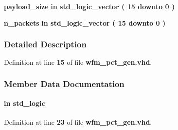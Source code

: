 \begin{DoxyCompactItemize}
\item 
{\bf payload\+\_\+size}  {\bfseries {\bfseries \textcolor{keywordflow}{in}\textcolor{vhdlchar}{ }}} {\bfseries \textcolor{comment}{std\+\_\+logic\+\_\+vector}\textcolor{vhdlchar}{ }\textcolor{vhdlchar}{(}\textcolor{vhdlchar}{ }\textcolor{vhdlchar}{ } \textcolor{vhdldigit}{15} \textcolor{vhdlchar}{ }\textcolor{keywordflow}{downto}\textcolor{vhdlchar}{ }\textcolor{vhdlchar}{ } \textcolor{vhdldigit}{0} \textcolor{vhdlchar}{ }\textcolor{vhdlchar}{)}\textcolor{vhdlchar}{ }} 
\item 
{\bf n\+\_\+packets}  {\bfseries {\bfseries \textcolor{keywordflow}{in}\textcolor{vhdlchar}{ }}} {\bfseries \textcolor{comment}{std\+\_\+logic\+\_\+vector}\textcolor{vhdlchar}{ }\textcolor{vhdlchar}{(}\textcolor{vhdlchar}{ }\textcolor{vhdlchar}{ } \textcolor{vhdldigit}{15} \textcolor{vhdlchar}{ }\textcolor{keywordflow}{downto}\textcolor{vhdlchar}{ }\textcolor{vhdlchar}{ } \textcolor{vhdldigit}{0} \textcolor{vhdlchar}{ }\textcolor{vhdlchar}{)}\textcolor{vhdlchar}{ }} 
\end{DoxyCompactItemize}


\subsubsection{Detailed Description}


Definition at line {\bf 15} of file {\bf wfm\+\_\+pct\+\_\+gen.\+vhd}.



\subsubsection{Member Data Documentation}
\paragraph[{clk}]{ {\bfseries \textcolor{keywordflow}{in}\textcolor{vhdlchar}{ }} {\bfseries \textcolor{comment}{std\+\_\+logic}\textcolor{vhdlchar}{ }} \hspace{0.3cm}{\ttfamily [Port]}}\label{classwfm__pct__gen_a4a4609c199d30b3adebbeb3a01276ec5}


Definition at line {\bf 23} of file {\bf wfm\+\_\+pct\+\_\+gen.\+vhd}.

